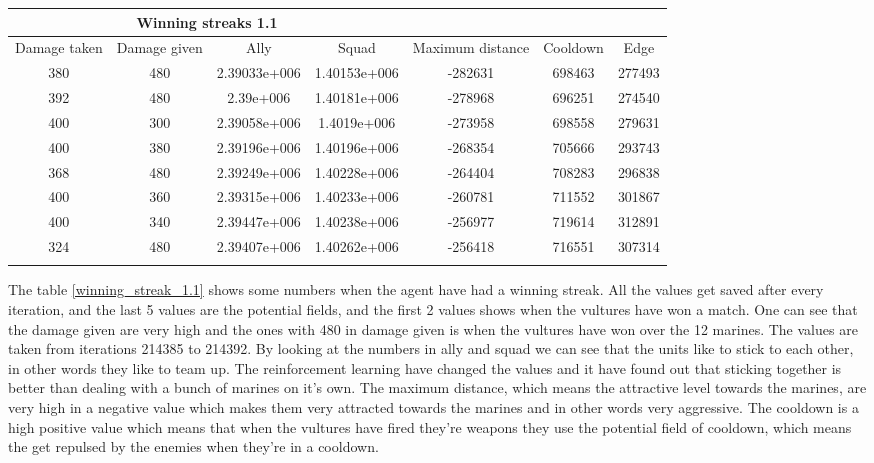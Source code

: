 
\begin{centering}
 \begin{tabular}{|c||c|c|c|c|c|c|}
	\multicolumn{4}{c}{Winning streaks 1.1} \\
	\hline
	Damage taken &			 Damage given &		 Ally &		 Squad &		 Maximum distance &		 Cooldown & 		Edge \\
	\hline
	380& 				 		480&						2.39033e+006&1.40153e+006&-282631&			698463&			277493\\
	392& 						480& 					2.39e+006&		1.40181e+006&-278968&			696251&			274540\\
	400& 						300& 					2.39058e+006&1.4019e+006&	-273958&			698558&			279631\\
	400& 						380& 					2.39196e+006&1.40196e+006&-268354&			705666&			293743\\
	368& 						480& 					2.39249e+006&1.40228e+006&-264404&			708283&			296838\\
	400& 						360& 					2.39315e+006&1.40233e+006&-260781&			711552&			301867\\
	400& 						340& 					2.39447e+006&1.40238e+006&-256977&			719614&			312891\\
	324& 						480&						2.39407e+006&1.40262e+006&-256418&			716551&			307314\\
	\hline
	\label{winning_streak_1.1}
\end{tabular}
\end{centering}
The table \ref{winning_streak_1.1} shows some numbers when the agent have had a winning streak. All the values get saved after every iteration, and the last 5 values are the potential fields, and the first 2 values shows when the vultures have won a match. One can see that the damage given are very high and the ones with 480 in damage given is when the vultures have won over the 12 marines. The values are taken from iterations 214385 to 214392. By looking at the numbers in ally and squad we can see that the units like to stick to each other, in other words they like to team up. The reinforcement learning have changed the values and it have found out that sticking together is better than dealing with a bunch of marines on it's own. The maximum distance, which means the attractive level towards the marines, are very high in a negative value which makes them very attracted towards the marines and in other words very aggressive. The cooldown is a high positive value which means that when the vultures have fired they're weapons they use the potential field of cooldown, which means the get repulsed by the enemies when they're in a cooldown. 







